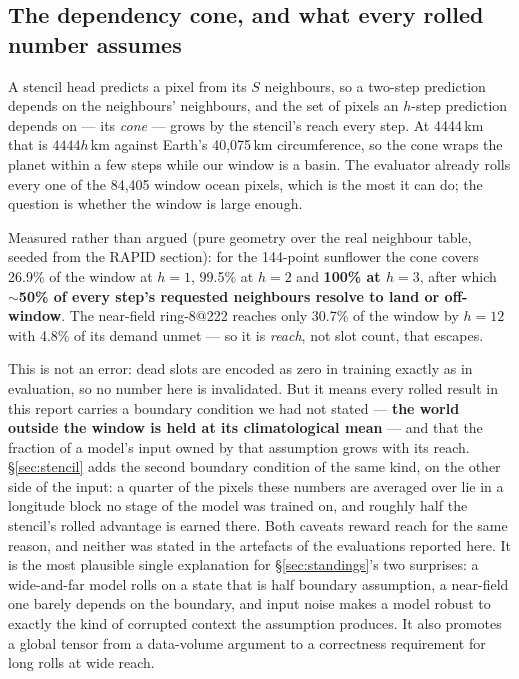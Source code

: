 \documentclass[10pt]{article}
\begin{document}
\subsection{The dependency cone, and what every rolled number
assumes}\label{sec:cone}

A stencil head predicts a pixel from its $S$ neighbours, so a two-step
prediction depends on the neighbours' neighbours, and the set of pixels an
$h$-step prediction depends on --- its \emph{cone} --- grows by the
stencil's reach every step. At 4444\,km that is $4444h$\,km against Earth's
40{,}075\,km circumference, so the cone wraps the planet within a few steps
while our window is a basin. The evaluator already rolls every one of the
84{,}405 window ocean pixels, which is the most it can do; the question is
whether the window is large enough.

Measured rather than argued (pure geometry over the real neighbour table,
seeded from the RAPID section): for the 144-point sunflower the cone covers
26.9\% of the window at $h{=}1$, 99.5\% at $h{=}2$ and \textbf{100\% at
$h{=}3$}, after which \textbf{$\sim$50\% of every step's requested
neighbours resolve to land or off-window}. The near-field ring-8@222 reaches
only 30.7\% of the window by $h{=}12$ with 4.8\% of its demand unmet --- so
it is \emph{reach}, not slot count, that escapes.

This is not an error: dead slots are encoded as zero in training exactly as
in evaluation, so no number here is invalidated. But it means every rolled
result in this report carries a boundary condition we had not stated ---
\textbf{the world outside the window is held at its climatological mean} ---
and that the fraction of a model's input owned by that assumption grows with
its reach. \S\ref{sec:stencil} adds the second boundary condition of the
same kind, on the other side of the input: a quarter of the pixels these
numbers are averaged over lie in a longitude block no stage of the model
was trained on, and roughly half the stencil's rolled advantage is
earned there. Both caveats reward reach for the same reason, and neither
was stated in the artefacts of the evaluations reported here. It is the most plausible single explanation for
\S\ref{sec:standings}'s two surprises: a wide-and-far model rolls on a state
that is half boundary assumption, a near-field one barely depends on the
boundary, and input noise makes a model robust to exactly the kind of
corrupted context the assumption produces. It also promotes a global tensor
from a data-volume argument to a correctness requirement for long rolls at
wide reach.
\end{document}
